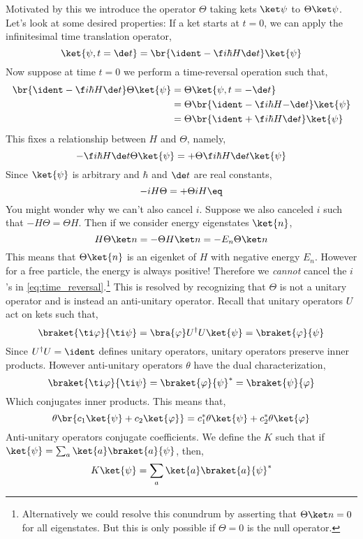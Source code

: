 \documentclass{article}
\begin{document}
Motivated by this we introduce the  operator $\Theta$ taking kets $\ket \psi$ to $\Theta \ket \psi$. Let's look at some desired properties: If a ket starts at $t = 0$, we can apply the infinitesimal time translation operator,
\[ \ket{\psi, t = \de t} = \br{\ident - \f i \hbar H \de t} \ket{\psi} \]
Now suppose at time $t = 0$ we perform a time-reversal operation such that,
\begin{align*}
\br{\ident - \f i \hbar H \de t} \Theta \ket{\psi}
&= \Theta \ket{\psi, t = - \de t} \\
&= \Theta \br{\ident - \f i \hbar H {-\de t}} \ket{\psi} \\
&= \Theta \br{\ident + \f i \hbar H \de t} \ket{\psi}
\end{align*}
This fixes a relationship between $H$ and $\Theta$, namely,
\[ -\f i \hbar H \de t \Theta \ket{\psi} = + \Theta \f i \hbar H \de t  \ket{\psi} \]
Since $\ket{\psi}$ is arbitrary and $\hbar$ and $\de t$ are real constants,
\[ -iH \Theta = + \Theta iH  \eq \label{eq:time_reversal}\]
You might wonder why we can't also cancel $i$. Suppose we also canceled $i$ such that $-H \Theta = \Theta H$. Then if we consider energy eigenstates $\ket{n}$,
\[ H \Theta \ket n = - \Theta H \ket n = - E_n \Theta \ket n \]
This means that $\Theta \ket{n}$ is an eigenket of $H$ with negative energy $E_n$. However for a free particle, the energy is always positive! Therefore we \textit{cannot} cancel the $i$'s in \cref{eq:time_reversal}.\footnote{Alternatively we could resolve this conundrum by asserting that $\Theta \ket n = 0$ for all eigenstates. But this is only possible if $\Theta = 0$ is the null operator.} This is resolved by recognizing that $\Theta$ is not a unitary operator and is instead an anti-unitary operator. Recall that unitary operators $U$ act on kets such that,
\[ \braket{\ti \varphi}{\ti \psi} = \bra{\varphi}U^{\dagger} U\ket{\psi} = \braket{\varphi}{\psi} \]
Since $U^{\dagger}U = \ident$ defines unitary operators, unitary operators preserve inner products. However anti-unitary operators $\theta$ have the dual characterization,
\[ \braket{\ti \varphi}{\ti \psi} = \braket{\varphi}{\psi}^* = \braket{\psi}{\varphi} \]
Which conjugates inner products. This means that,
\[ \theta \br{c_1  \ket{\psi} + c_2 \ket{\varphi}} = c_1^* \theta \ket{\psi} + c_2^* \theta \ket{\varphi} \]
Anti-unitary operators conjugate coefficients. We define the  $K$ such that if $\ket{\psi} = \sum_a \ket{a}\braket{a}{\psi}$, then,
\[ K \ket{\psi} = \sum_{a} \ket{a} \braket{a}{\psi}^* \]
\end{document}
